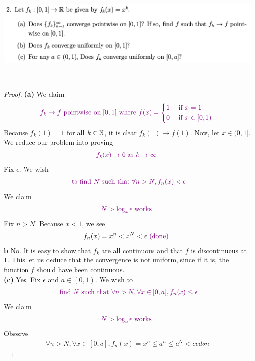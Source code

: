 \documentclass{report}
\begin{document}
\begin{question}{}{}
\includegraphics[height=5cm,width=18cm]{HW1.6}
\end{question}
\begin{proof}
\textbf{(a)} We claim 
\begin{align*}
\textcolor{violet}{f_k\to f\text{ pointwise on $[0,1]$ where }f(x)=\begin{cases}
  1& \text{ if $x=1$ }\\
  0& \text{ if $x\in [0,1)$ }
\end{cases}}
\end{align*}
Because $f_k(1)=1$ for all $k\in\mathbb{N}$, it is clear $f_k(1)\to f(1)$. Now, let $x \in (0,1]$. We reduce our problem into proving 
\begin{align*}
\textcolor{violet}{f_k(x)\to 0\text{ as $k \to \infty$ }}
\end{align*}
Fix $\epsilon $. We wish  
\begin{align*}
\textcolor{violet}{\text{ to find $N$ such that }\forall n>N, f_n(x)< \epsilon }
\end{align*}
We claim 
\begin{align*}
  \textcolor{violet}{N>\log_x \epsilon\text{ works }}
\end{align*}
Fix $n>N$. Because $x<1$,  we see 
 \begin{align*}
f_n(x)=x^n<x^N<\epsilon \textcolor{violet}{\text{ (done) }}
\end{align*}
\textbf{b}
No. It is easy to show that $f_k$ are all continuous and that $f$ is discontinuous at $1$. This let us deduce that the convergence is not uniform, since if it is, the function $f$ should have been continuous.\\

\textbf{(c)} Yes. Fix $\epsilon $ and $a \in (0,1)$. We wish to 
\begin{align*}
\textcolor{violet}{\text{ find $N$ such that }\forall n>N,\forall x \in [0,a], f_n(x)\leq \epsilon }
\end{align*}
We claim 
\begin{align*}
\textcolor{violet}{N>\log_a \epsilon \text{ works }}
\end{align*}
Observe 
\begin{align*}
\forall n >N, \forall  x\in [0,a], f_n(x)=x^n \leq a^n \leq a^N <\epsilon vdon
\end{align*}

\end{proof}
\end{document}
